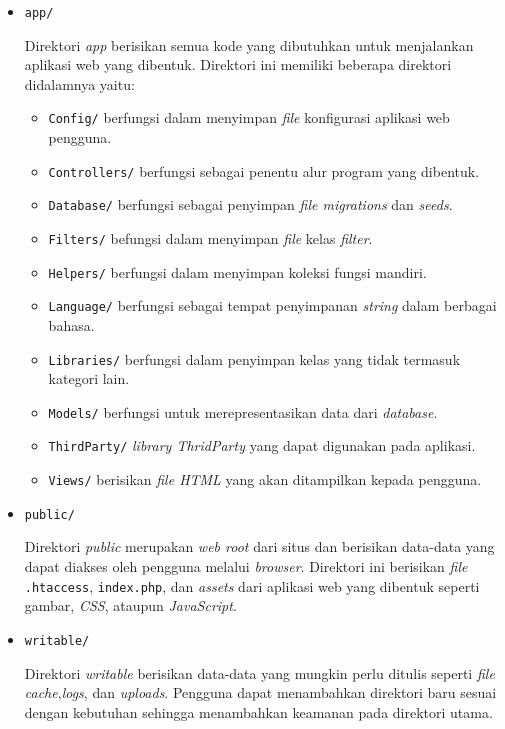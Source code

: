\begin{itemize}
\item \texttt{app/}

Direktori \textit{app} berisikan semua kode yang dibutuhkan untuk menjalankan aplikasi web yang dibentuk. Direktori ini memiliki beberapa direktori didalamnya yaitu:
\begin{itemize}
\item \verb|Config/| berfungsi dalam menyimpan \textit{file} konfigurasi aplikasi web pengguna.
\item \verb|Controllers/| berfungsi sebagai penentu alur program yang dibentuk.
\item \verb|Database/| berfungsi sebagai penyimpan \textit{file migrations} dan \textit{seeds}.
\item \verb|Filters/| befungsi dalam menyimpan \textit{file} kelas \textit{filter}.
\item \verb|Helpers/| berfungsi dalam menyimpan koleksi fungsi mandiri.
\item \verb|Language/| berfungsi sebagai tempat penyimpanan \textit{string} dalam berbagai bahasa.
\item \verb|Libraries/| berfungsi dalam penyimpan kelas yang tidak termasuk kategori lain.
\item \verb|Models/| berfungsi untuk merepresentasikan data dari \textit{database}.
\item \verb|ThirdParty/| \textit{library ThridParty} yang dapat digunakan pada aplikasi.
\item \verb|Views/| berisikan \textit{file HTML} yang akan ditampilkan kepada pengguna.
\end{itemize}

\item \texttt{public/}

Direktori \textit{public} merupakan \textit{web root} dari situs dan berisikan data-data yang dapat diakses oleh pengguna melalui \textit{browser}. Direktori ini berisikan \textit{file} \verb|.htaccess|, \verb|index.php|, dan \textit{assets} dari aplikasi web yang dibentuk seperti gambar, \textit{CSS}, ataupun \textit{JavaScript}.

\item \texttt{writable/}

Direktori \textit{writable} berisikan data-data yang mungkin perlu ditulis seperti \textit{file cache},\textit{logs}, dan \textit{uploads}. Pengguna dapat menambahkan direktori baru sesuai dengan kebutuhan sehingga menambahkan keamanan pada direktori utama.


\end{itemize}

